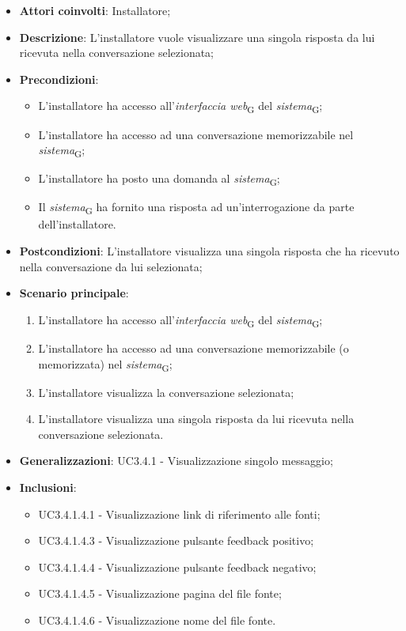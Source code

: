 \begin{itemize}
    \item \textbf{Attori coinvolti}: Installatore;
    \item \textbf{Descrizione}: L'installatore vuole visualizzare una singola risposta da lui ricevuta nella conversazione selezionata;
    \item \textbf{Precondizioni}: 
    \begin{itemize}
        \item L’installatore ha accesso all’\textit{interfaccia web}\textsubscript{G} del \textit{sistema}\textsubscript{G};
        \item L’installatore ha accesso ad una conversazione memorizzabile nel \textit{sistema}\textsubscript{G};
        \item L'installatore ha posto una domanda al \textit{sistema}\textsubscript{G};
        \item Il \textit{sistema}\textsubscript{G} ha fornito una risposta ad un’interrogazione da parte dell’installatore.
    \end{itemize}
    \item \textbf{Postcondizioni}: L'installatore visualizza una singola risposta che ha ricevuto nella conversazione da lui selezionata;
    \item \textbf{Scenario principale}:
    \begin{enumerate}
        \item L’installatore ha accesso all’\textit{interfaccia web}\textsubscript{G} del \textit{sistema}\textsubscript{G};
        \item L’installatore ha accesso ad una conversazione memorizzabile (o memorizzata) nel \textit{sistema}\textsubscript{G};
        \item L'installatore visualizza la conversazione selezionata;
        \item L'installatore visualizza una singola risposta da lui ricevuta nella conversazione selezionata.
    \end{enumerate}
    \item \textbf{Generalizzazioni}: UC3.4.1 - Visualizzazione singolo messaggio;
    \item \textbf{Inclusioni}: 
    \begin{itemize}
        \item UC3.4.1.4.1 - Visualizzazione link di riferimento alle fonti;
        \item UC3.4.1.4.3 - Visualizzazione pulsante feedback positivo;
        \item UC3.4.1.4.4 - Visualizzazione pulsante feedback negativo;
        \item UC3.4.1.4.5 - Visualizzazione pagina del file fonte;
        \item UC3.4.1.4.6 - Visualizzazione nome del file fonte.
    \end{itemize}
\end{itemize}

